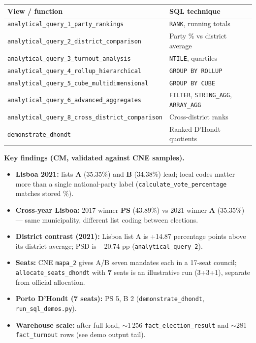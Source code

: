 \begin{center}
\small
\begin{tabular}{|l|l|}
\hline
\textbf{View / function} & \textbf{SQL technique} \\
\hline
\texttt{analytical\_query\_1\_party\_rankings} & \texttt{RANK}, running totals \\
\texttt{analytical\_query\_2\_district\_comparison} & Party \% vs district average \\
\texttt{analytical\_query\_3\_turnout\_analysis} & \texttt{NTILE}, quartiles \\
\texttt{analytical\_query\_4\_rollup\_hierarchical} & \texttt{GROUP BY ROLLUP} \\
\texttt{analytical\_query\_5\_cube\_multidimensional} & \texttt{GROUP BY CUBE} \\
\texttt{analytical\_query\_6\_advanced\_aggregates} & \texttt{FILTER}, \texttt{STRING\_AGG}, \texttt{ARRAY\_AGG} \\
\texttt{analytical\_query\_8\_cross\_district\_comparison} & Cross-district ranks \\
\texttt{demonstrate\_dhondt} & Ranked D'Hondt quotients \\
\hline
\end{tabular}
\end{center}

\textbf{Key findings (CM, validated against CNE samples).}
\begin{itemize}
    \item \textbf{Lisboa 2021:} lists \textbf{A} (35.35\%) and \textbf{B} (34.38\%) lead; local codes matter more than a single national-party label (\texttt{calculate\_vote\_percentage} matches stored \%).
    \item \textbf{Cross-year Lisboa:} 2017 winner \textbf{PS} (43.89\%) vs 2021 winner \textbf{A} (35.35\%) --- same municipality, different list coding between elections.
    \item \textbf{District contrast (2021):} Lisboa list A is +14.87 percentage points above its district average; PSD is $-$20.74 pp (\texttt{analytical\_query\_2}).
    \item \textbf{Seats:} CNE \texttt{mapa\_2} gives A/B seven mandates each in a 17-seat council; \texttt{allocate\_seats\_dhondt} with \textbf{7} seats is an illustrative run (3+3+1), separate from official allocation.
    \item \textbf{Porto D'Hondt (7 seats):} PS 5, B 2 (\texttt{demonstrate\_dhondt}, \texttt{run\_sql\_demos.py}).
    \item \textbf{Warehouse scale:} after full load, $\sim$1\,256 \texttt{fact\_election\_result} and $\sim$281 \texttt{fact\_turnout} rows (see demo output tail).
\end{itemize}

